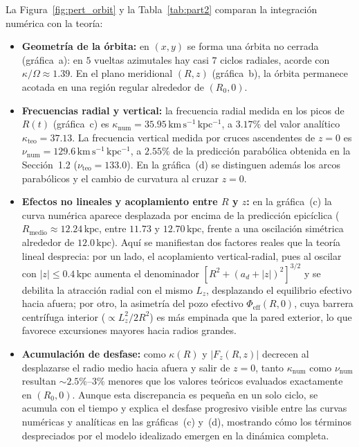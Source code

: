 \documentclass[11pt,letterpaper]{article}
\begin{document}
La Figura~\ref{fig:pert_orbit} y la Tabla~\ref{tab:part2} comparan la integración numérica con la teoría:
\begin{itemize}
    \item \textbf{Geometría de la órbita:} en $(x,y)$ se forma una órbita no cerrada (gráfica~a): en $5$ vueltas azimutales hay casi $7$ ciclos radiales, acorde con $\kappa/\Omega \approx 1.39$. En el plano meridional $(R,z)$ (gráfica~b), la órbita permanece acotada en una región regular alrededor de $(R_0, 0)$.
    \item \textbf{Frecuencias radial y vertical:} la frecuencia radial medida en los picos de $R(t)$ (gráfica~c) es $\kappa_{\mathrm{num}} = 35.95\,\mathrm{km\,s^{-1}\,kpc^{-1}}$, a $3.17\%$ del valor analítico $\kappa_{\mathrm{teo}} = 37.13$. La frecuencia vertical medida por cruces ascendentes de $z = 0$ es $\nu_{\mathrm{num}} = 129.6\,\mathrm{km\,s^{-1}\,kpc^{-1}}$, a $2.55\%$ de la predicción parabólica obtenida en la Sección~1.2 ($\nu_{\mathrm{teo}} = 133.0$). En la gráfica~(d) se distinguen además los arcos parabólicos y el cambio de curvatura al cruzar $z = 0$.
    \item \textbf{Efectos no lineales y acoplamiento entre $R$ y $z$:} en la gráfica~(c) la curva numérica aparece desplazada por encima de la predicción epicíclica ($R_{\text{medio}} \approx 12.24\,\mathrm{kpc}$, entre $11.73$ y $12.70\,\mathrm{kpc}$, frente a una oscilación simétrica alrededor de $12.0\,\mathrm{kpc}$). Aquí se manifiestan dos factores reales que la teoría lineal desprecia: por un lado, el acoplamiento vertical-radial, pues al oscilar con $|z| \le 0.4\,\mathrm{kpc}$ aumenta el denominador $[R^2 + (a_d + |z|)^2]^{3/2}$ y se debilita la atracción radial con el mismo $L_z$, desplazando el equilibrio efectivo hacia afuera; por otro, la asimetría del pozo efectivo $\Phi_{\mathrm{eff}}(R,0)$, cuya barrera centrífuga interior ($\propto L_z^2/2R^2$) es más empinada que la pared exterior, lo que favorece excursiones mayores hacia radios grandes.
    \item \textbf{Acumulación de desfase:} como $\kappa(R)$ y $|F_z(R,z)|$ decrecen al desplazarse el radio medio hacia afuera y salir de $z = 0$, tanto $\kappa_{\mathrm{num}}$ como $\nu_{\mathrm{num}}$ resultan $\sim 2.5\%$--$3\%$ menores que los valores teóricos evaluados exactamente en $(R_0, 0)$. Aunque esta discrepancia es pequeña en un solo ciclo, se acumula con el tiempo y explica el desfase progresivo visible entre las curvas numéricas y analíticas en las gráficas~(c) y~(d), mostrando cómo los términos despreciados por el modelo idealizado emergen en la dinámica completa.
\end{itemize}
\end{document}
